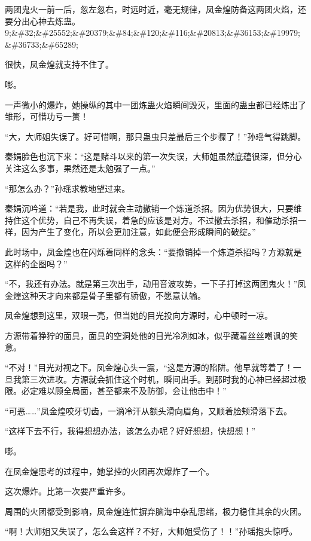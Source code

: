 
\begin{this_body}

两团鬼火一前一后，忽左忽右，时远时近，毫无规律，凤金煌防备这两团火焰，还要分出心神去炼蛊。9;\&\#32;\&\#25552;\&\#20379;\&\#84;\&\#120;\&\#116;\&\#20813;\&\#36153;\&\#19979;\&\#36733;\&\#65289;

很快，凤金煌就支持不住了。

嘭。

一声微小的爆炸，她操纵的其中一团炼蛊火焰瞬间毁灭，里面的蛊虫都已经炼出了雏形，可惜功亏一篑！

“大，大师姐失误了。好可惜啊，那只蛊虫只差最后三个步骤了！”孙瑶气得跳脚。

秦娟脸色也沉下来：“这是赌斗以来的第一次失误，大师姐虽然底蕴很深，但分心关注这么多事，果然还是太勉强了一点。”

“那怎么办？”孙瑶求教地望过来。

秦娟沉吟道：“若是我，此时就会主动撤销一个炼道杀招。因为优势很大，只要维持住这个优势，自己不再失误，着急的应该是对方。不过撤去杀招，和催动杀招一样，因为产生了变化，所以会更加注意，如此便会形成瞬间的破绽。”

此时场中，凤金煌也在闪烁着同样的念头：“要撤销掉一个炼道杀招吗？方源就是这样的企图吗？”

“不，我还有办法。就是第三次出手，动用音波攻势，一下子打掉这两团鬼火！”凤金煌这种天才向来都是骨子里都有骄傲，不愿意认输。

凤金煌想到这里，双眼一亮，但当她的目光投向方源时，心中顿时一凉。

方源带着狰狞的面具，面具的空洞处他的目光冷冽如冰，似乎藏着丝丝嘲讽的笑意。

“不对！”目光对视之下。凤金煌心头一震，“这是方源的陷阱。他早就等着了！一旦我第三次进攻。方源就会抓住这个时机，瞬间出手。到那时我的心神已经超过极限。必定难以顾全局面，甚至都来不及防御，会让他击中！”

“可恶……”凤金煌咬牙切齿，一滴冷汗从额头滑向眉角，又顺着脸颊滑落下去。

“这样下去不行，我得想想办法，该怎么办呢？好好想想，快想想！”

嘭。

在凤金煌思考的过程中，她掌控的火团再次爆炸了一个。

这次爆炸。比第一次要严重许多。

周围的火团都受到影响，凤金煌连忙摒弃脑海中杂乱思绪，极力稳住其余的火团。

“啊！大师姐又失误了，怎么会这样？不好，大师姐受伤了！！”孙瑶抱头惊呼。


\end{this_body}
